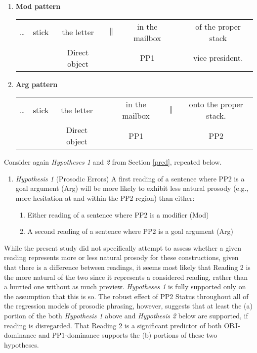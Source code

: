 \documentclass[11pt,oneside]{book}
\providecommand{\tightlist}{%
  \setlength{\itemsep}{0pt}\setlength{\parskip}{0pt}}
\begin{document}
\begin{enumerate}
\def\labelenumi{(\arabic{enumi})}
\setcounter{enumi}{39}
\tightlist
\item
  \textbf{Mod pattern}
  \begingroup
  \setlength{\tabcolsep}{2pt}

  \begin{tabular}{ccccccc}
    \dots & stick & the letter & $\|$ & in the mailbox &  & of the proper stack \\
    & & \footnotesize Direct object & & \footnotesize PP1 & & \footnotesize vice president. \\
  \end{tabular}
    \endgroup
\item
  \textbf{Arg pattern}
  \begingroup
  \setlength{\tabcolsep}{2pt}

  \begin{tabular}{ccccccc}
    \dots & stick & the letter & & in the mailbox & $\|$ & onto the proper stack. \\
    & & \footnotesize Direct object & & \footnotesize PP1 & & \footnotesize PP2 \\
  \end{tabular}
    \endgroup
\end{enumerate}

\doublespacing

Consider again \emph{Hypotheses 1} and \emph{2} from Section \ref{pred}, repeated below.

\begin{enumerate}
\def\labelenumi{(\arabic{enumi})}
\setcounter{enumi}{41}
\tightlist
\item
  \emph{Hypothesis 1} (Prosodic Errors)\linebreak\nopagebreak
  A first reading of a sentence where PP2 is a goal argument (Arg) will be more likely to exhibit less natural prosody (e.g., more hesitation at and within the PP2 region) than either:

  \begin{enumerate}
  \def\labelenumii{\alph{enumii}.}
  \tightlist
  \item
    Either reading of a sentence where PP2 is a modifier (Mod)
  \item
    A second reading of a sentence where PP2 is a goal argument (Arg)
  \end{enumerate}
\end{enumerate}

While the present study did not specifically attempt to assess whether a given reading represents more or less natural prosody for these constructions, given that there is a difference between readings, it seems most likely that Reading 2 is the more natural of the two since it represents a considered reading, rather than a hurried one without as much preview. \emph{Hypotheses 1} is fully supported only on the assumption that this is so. The robust effect of PP2 Status throughout all of the regression models of prosodic phrasing, however, suggests that at least the (a) portion of the both \emph{Hypothesis 1} above and \emph{Hypothesis 2} below are supported, if reading is disregarded. That Reading 2 is a significant predictor of both OBJ-dominance and PP1-dominance supports the (b) portions of these two hypotheses.
\end{document}
